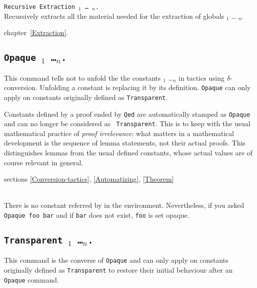 \begin{Variants}
\item \texttt{Recursive Extraction {\qualid$_1$} \ldots{} {\qualid$_n$}.}\\
  Recursively extracts all the material needed for the extraction of 
  globals {\qualid$_1$} \ldots{} {\qualid$_n$}.
\end{Variants}

\SeeAlso chapter~\ref{Extraction}.

\subsection[\tt Opaque \qualid$_1$ \dots \qualid$_n$.]{\tt Opaque \qualid$_1$ \dots \qualid$_n$.\label{Opaque}} This command tells not to unfold the
the constants {\qualid$_1$} \dots {\qualid$_n$} in tactics using
$\delta$-conversion. Unfolding a constant is replacing it by its
definition. {\tt Opaque} can only apply on constants originally
defined as {\tt Transparent}.

Constants defined by a proof ended by {\tt Qed} are automatically
stamped as {\tt Opaque} and can no longer be considered as {\tt
Transparent}. This is to keep with the usual mathematical practice of
{\em proof irrelevance}: what matters in a mathematical development is
the sequence of lemma statements, not their actual proofs. This
distinguishes lemmas from the usual defined constants, whose actual
values are of course relevant in general.

\SeeAlso sections \ref{Conversion-tactics}, \ref{Automatizing},
\ref{Theorem}

\begin{ErrMsgs}
\item {}\\
    There is no constant referred by {\qualid} in the environment.
    Nevertheless, if you asked \texttt{Opaque foo bar}
    and if \texttt{bar} does not exist, \texttt{foo} is set opaque.
\end{ErrMsgs}

\subsection[\tt Transparent \qualid$_1$ \dots \qualid$_n$.]{\tt Transparent \qualid$_1$ \dots \qualid$_n$.\label{Transparent}}
This command is the converse of {\tt Opaque} and can only apply on constants originally defined as {\tt Transparent} to restore their initial behaviour after an {\tt Opaque} command.

